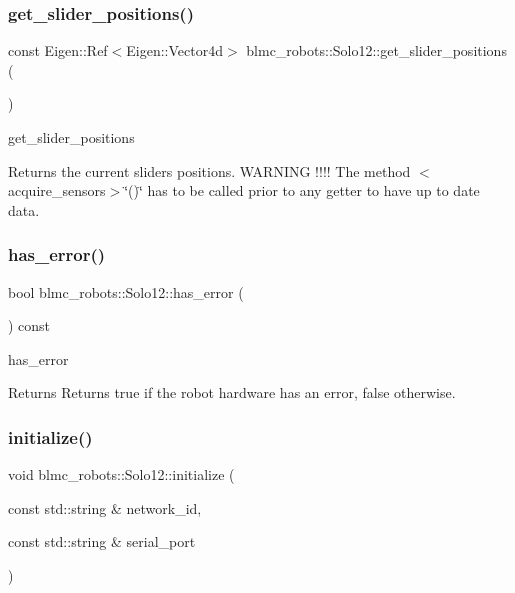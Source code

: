 \subsubsection{\texorpdfstring{get\+\_\+slider\+\_\+positions()}{get\_slider\_positions()}}
{\footnotesize\ttfamily const Eigen\+::\+Ref$<$Eigen\+::\+Vector4d$>$ blmc\+\_\+robots\+::\+Solo12\+::get\+\_\+slider\+\_\+positions (\begin{DoxyParamCaption}{ }\end{DoxyParamCaption})\hspace{0.3cm}{\ttfamily [inline]}}



get\+\_\+slider\+\_\+positions 

\begin{DoxyReturn}{Returns}
the current sliders positions. W\+A\+R\+N\+I\+NG !!!! The method $<$acquire\+\_\+sensors$>$\char`\"{}()\char`\"{} has to be called prior to any getter to have up to date data. 
\end{DoxyReturn}
\mbox{\label{classblmc__robots_1_1Solo12_af8d51ec7885dab9c017aec9dd11937ad}} 
\subsubsection{\texorpdfstring{has\+\_\+error()}{has\_error()}}
{\footnotesize\ttfamily bool blmc\+\_\+robots\+::\+Solo12\+::has\+\_\+error (\begin{DoxyParamCaption}{ }\end{DoxyParamCaption}) const\hspace{0.3cm}{\ttfamily [inline]}}



has\+\_\+error 

\begin{DoxyReturn}{Returns}
Returns true if the robot hardware has an error, false otherwise. 
\end{DoxyReturn}
\mbox{\label{classblmc__robots_1_1Solo12_ae3b1480bc12a079939b627950d55f66a}} 
\subsubsection{\texorpdfstring{initialize()}{initialize()}}
{\footnotesize\ttfamily void blmc\+\_\+robots\+::\+Solo12\+::initialize (\begin{DoxyParamCaption}\item[{const std\+::string \&}]{network\+\_\+id,  }\item[{const std\+::string \&}]{serial\+\_\+port }\end{DoxyParamCaption})}



